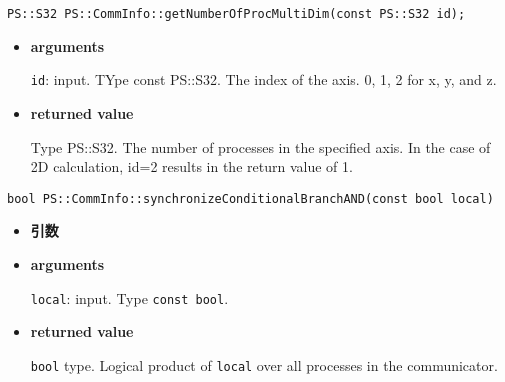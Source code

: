 
\begin{screen}
\begin{verbatim}
PS::S32 PS::CommInfo::getNumberOfProcMultiDim(const PS::S32 id);
\end{verbatim}
\end{screen}

\begin{itemize}

\item{{\bf arguments}}

{\tt id}: input. TYpe const PS::S32. The index of the axis. 0, 1, 2
for x, y, and z.

\item{{\bf returned value}}

Type PS::S32. The number of processes in the specified axis. In the case of 2D
calculation, id=2 results in the return value of 1.






\end{itemize}


\begin{screen}
\begin{verbatim}
bool PS::CommInfo::synchronizeConditionalBranchAND(const bool local)
\end{verbatim}
\end{screen}

\begin{itemize}

\item{{\bf 引数}}

\item{\bf arguments}

{\tt local}: input. Type {\tt const bool}.


\item{\bf returned value}

{\tt bool} type. Logical product of {\tt local} over all processes in
the communicator.





\end{itemize}

